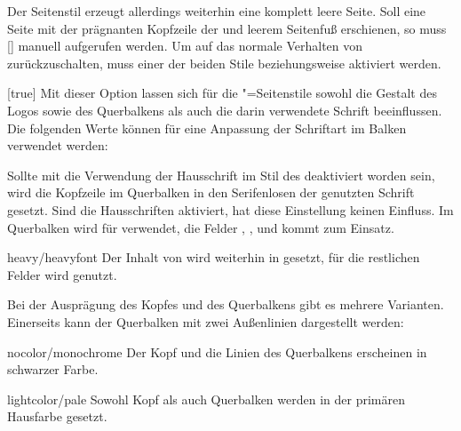 \begin{Declaration*}{}
\begin{Declaration*}{}
\begin{Declaration*}{}
\begin{Declaration}[v2.02]{}
\begin{Declaration}[v2.02]{}
\begin{Declaration}[v2.02]{}
Der Seitenstil  erzeugt allerdings weiterhin eine komplett 
leere Seite. Soll eine Seite mit der prägnanten Kopfzeile der \TnUD und leerem 
Seitenfuß erschienen, so muss [] 
manuell aufgerufen werden. Um auf das normale Verhalten von \KOMAScript{} 
zurückzuschalten, muss einer der beiden Stile  
beziehungsweise  aktiviert werden.
%
\end{Declaration}
\end{Declaration}
\end{Declaration}

\begin{Declaration}[%
  v2.03;%
  v2.04!\Option{cdhead=barcolor}:nur farbig abgesetzter Querbalken;%
]{}[true]
\printdeclarationlist%
%
%
%
%
Mit dieser Option lassen sich für die "=Seitenstile 
sowohl die Gestalt des Logos sowie des Querbalkens als auch die darin 
verwendete Schrift beeinflussen. Die folgenden Werte können für eine Anpassung 
der Schriftart im Balken verwendet werden:
%
\begin{values}{}
\itemfalse
  Sollte mit  die Verwendung der Hausschrift im Stil des 
  \TUDCDs deaktiviert worden sein, wird die Kopfzeile im Querbalken in den 
  Serifenlosen der genutzten Schrift gesetzt. Sind die Hausschriften aktiviert, 
  hat diese Einstellung keinen Einfluss.
  Im Querbalken wird für   verwendet, 
  die Felder , ,  und 
   kommt  zum Einsatz.
\item[heavy/heavyfont]
  Der Inhalt von  wird weiterhin in  
  gesetzt, für die restlichen Felder wird  genutzt.
\end{values}
%
Bei der Ausprägung des Kopfes und des Querbalkens gibt es mehrere Varianten. 
Einerseits kann der Querbalken mit zwei Außenlinien dargestellt werden:
%
\begin{values}{}
\item[nocolor/monochrome]
  Der Kopf und die Linien des Querbalkens erscheinen in schwarzer Farbe.
\item[lightcolor/pale]
  Sowohl Kopf als auch Querbalken werden in der primären Hausfarbe gesetzt.

\end{values}
\end{Declaration}
\end{Declaration*}
\end{Declaration*}
\end{Declaration*}
